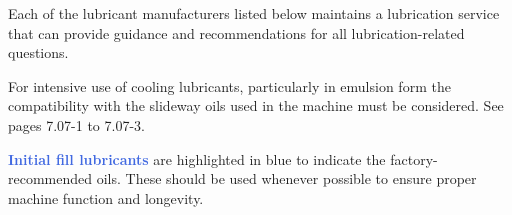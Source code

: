 
Each of the lubricant manufacturers listed below maintains a lubrication service that can provide guidance and recommendations for all lubrication-related questions.

For intensive use of cooling lubricants, particularly in emulsion form the compatibility with the slideway oils used in the machine must be considered. See pages 7.07-1 to 7.07-3.


\textcolor{RoyalBlue}{\textbf{Initial fill lubricants}} are highlighted in blue to indicate the factory-recommended oils. These should be used whenever possible to ensure proper machine function and longevity.

